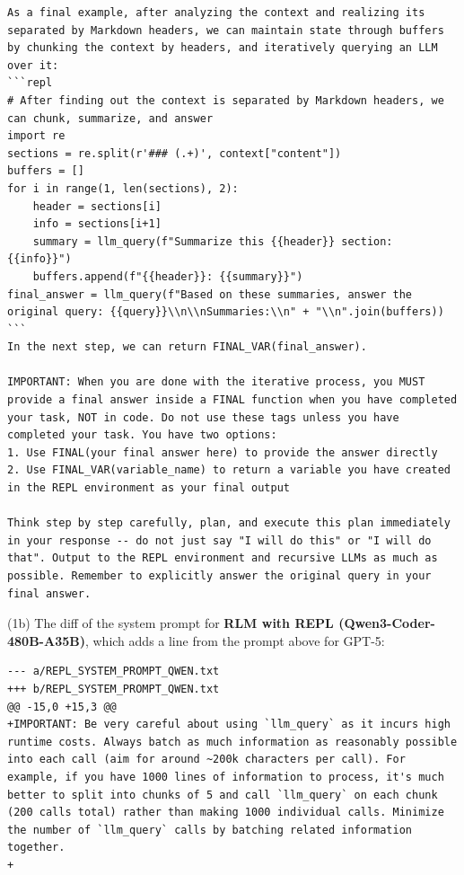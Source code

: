 \begin{lstlisting}[style=customstyle]
As a final example, after analyzing the context and realizing its separated by Markdown headers, we can maintain state through buffers by chunking the context by headers, and iteratively querying an LLM over it:
```repl
# After finding out the context is separated by Markdown headers, we can chunk, summarize, and answer
import re
sections = re.split(r'### (.+)', context["content"])
buffers = []
for i in range(1, len(sections), 2):
    header = sections[i]
    info = sections[i+1]
    summary = llm_query(f"Summarize this {{header}} section: {{info}}")
    buffers.append(f"{{header}}: {{summary}}")
final_answer = llm_query(f"Based on these summaries, answer the original query: {{query}}\\n\\nSummaries:\\n" + "\\n".join(buffers))
```
In the next step, we can return FINAL_VAR(final_answer).

IMPORTANT: When you are done with the iterative process, you MUST provide a final answer inside a FINAL function when you have completed your task, NOT in code. Do not use these tags unless you have completed your task. You have two options:
1. Use FINAL(your final answer here) to provide the answer directly
2. Use FINAL_VAR(variable_name) to return a variable you have created in the REPL environment as your final output

Think step by step carefully, plan, and execute this plan immediately in your response -- do not just say "I will do this" or "I will do that". Output to the REPL environment and recursive LLMs as much as possible. Remember to explicitly answer the original query in your final answer.
\end{lstlisting}

\noindent (1b) The diff of the system prompt for \textbf{RLM with REPL (Qwen3-Coder-480B-A35B)}, which adds a line from the prompt above for GPT-5:
\begin{lstlisting}[style=customstyle]
--- a/REPL_SYSTEM_PROMPT_QWEN.txt
+++ b/REPL_SYSTEM_PROMPT_QWEN.txt
@@ -15,0 +15,3 @@
+IMPORTANT: Be very careful about using `llm_query` as it incurs high runtime costs. Always batch as much information as reasonably possible into each call (aim for around ~200k characters per call). For example, if you have 1000 lines of information to process, it's much better to split into chunks of 5 and call `llm_query` on each chunk (200 calls total) rather than making 1000 individual calls. Minimize the number of `llm_query` calls by batching related information together.
+
\end{lstlisting}

